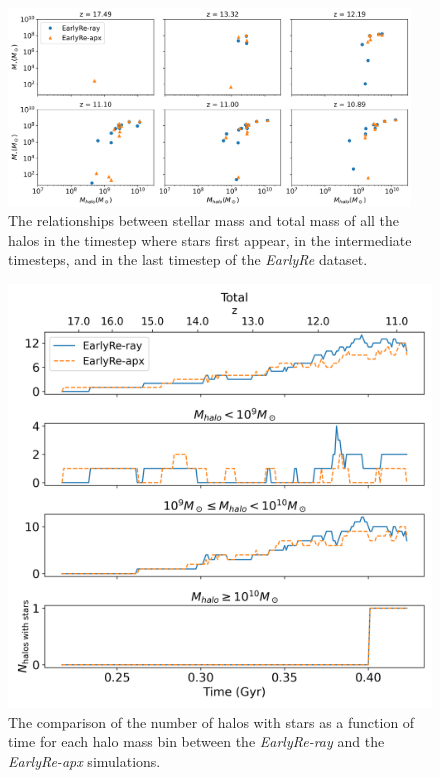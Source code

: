 \documentclass[linenumbers, twocolumn]{aastex631}
\begin{document}
\begin{figure}
    \centering
    \includegraphics[width=0.95\textwidth]{EarlyRe/stellarmass_totalmass_EarlyRe_starassignment.png}
    \caption{The relationships between stellar mass and total mass of all the halos in the timestep where stars first appear, in the intermediate timesteps, and in the last timestep of the \textit{EarlyRe} dataset.}
    \label{fig:SFR_stellar_total_EarlyRe}
\end{figure}
\begin{figure}
    \centering
    \includegraphics[width=0.95\columnwidth]{EarlyRe/number_of_halo_wstars.png}
    \caption{The comparison of the number of halos with stars as a function of time for each halo mass bin between the \textit{EarlyRe-ray} and the \textit{EarlyRe-apx} simulations.}
    \label{fig:number_halowstars_vs_time_EarlyRe}
\end{figure}
\end{document}
